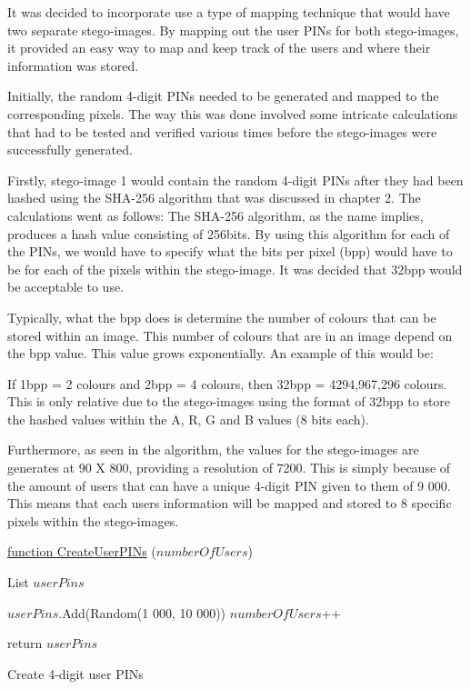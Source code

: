 It was decided to incorporate use a type of mapping technique that would have two separate stego-images. By mapping out the user PINs for both stego-images, it provided an easy way to map and keep track of the users and where their information was stored. 

Initially, the random 4-digit PINs needed to be generated and mapped to the corresponding pixels. The way this was done involved some intricate calculations that had to be tested and verified various times before the stego-images were successfully generated. 

Firstly, stego-image 1 would contain the random 4-digit PINs after they had been hashed using the SHA-256 algorithm that was discussed in chapter 2. The calculations went as follows:
The SHA-256 algorithm, as the name implies, produces a hash value consisting of 256bits. 
By using this algorithm for each of the PINs, we would have to specify what the bits per pixel (bpp) would have to be for each of the pixels within the stego-image. It was decided that 32bpp would be acceptable to use. 

Typically, what the bpp does is determine the number of colours that can be stored within an image. This number of colours that are in an image depend on the bpp value. This value grows exponentially. An example of this would be: 

If 1bpp = 2 colours and 2bpp = 4 colours, then 32bpp = 4294,967,296 colours. This is only relative due to the stego-images using the format of 32bpp to store the hashed values within the A, R, G and B values (8 bits each).

Furthermore, as seen in the algorithm, the values for the stego-images are generates at 90 X 800, providing a resolution of 7200. This is simply because of the amount of users that can have a unique 4-digit PIN given to them of 9 000. This means that each users information will be mapped and stored to 8 specific pixels within the stego-images. 



\begin{algorithm}
     
     \underline{function CreateUserPINs} ($numberOfUsers$)\;
     
     List $userPins$ \;
     
     {
        $userPins$.Add(Random(1 000, 10 000))\;
        $numberOfUsers$++\;
     }
     
     return $userPins$\;
     
     \caption{Create 4-digit user PINs}
\end{algorithm}

